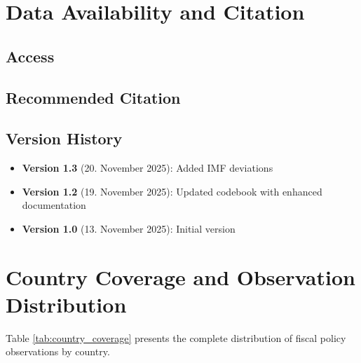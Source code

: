 \documentclass[12pt]{article}
\begin{document}
\newpage
\section{Data Availability and Citation}

\subsection{Access}



\subsection{Recommended Citation}



\subsection{Version History}

\begin{itemize}
\item \textbf{Version 1.3} (20. November 2025): Added IMF deviations
\item \textbf{Version 1.2} (19. November 2025): Updated codebook with enhanced documentation
\item \textbf{Version 1.0} (13. November 2025): Initial version
\end{itemize}

\newpage
\FloatBarrier



\vspace{0.3cm}


\newpage
\appendix

\section{Country Coverage and Observation Distribution}
\label{app:country_coverage}

Table \ref{tab:country_coverage} presents the complete distribution of fiscal policy observations by country.
\end{document}
